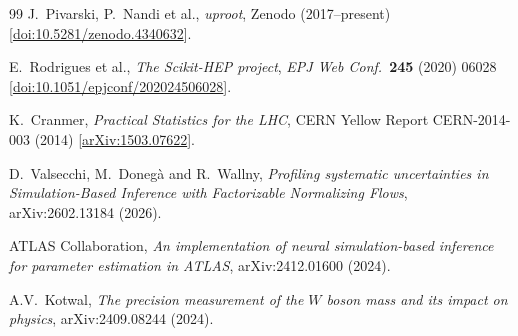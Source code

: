 \documentclass[a4paper,11pt]{article}
\begin{document}
\begin{thebibliography}{99}
  J.~Pivarski, P.~Nandi et al.,
  \emph{uproot},
  Zenodo (2017--present)
  [\href{https://doi.org/10.5281/zenodo.4340632}{doi:10.5281/zenodo.4340632}].

  E.~Rodrigues et al.,
  \emph{The Scikit-HEP project},
  \emph{EPJ Web Conf.}~\textbf{245} (2020) 06028
  [\href{https://doi.org/10.1051/epjconf/202024506028}{doi:10.1051/epjconf/202024506028}].

  K.~Cranmer,
  \emph{Practical Statistics for the LHC},
  CERN Yellow Report CERN-2014-003 (2014)
  [\href{https://arxiv.org/abs/1503.07622}{arXiv:1503.07622}].

  D.~Valsecchi, M.~Doneg{\`a} and R.~Wallny,
  \emph{Profiling systematic uncertainties in Simulation-Based Inference
    with Factorizable Normalizing Flows},
  arXiv:2602.13184 (2026).

  ATLAS Collaboration,
  \emph{An implementation of neural simulation-based inference for
    parameter estimation in ATLAS},
  arXiv:2412.01600 (2024).

  A.V.~Kotwal,
  \emph{The precision measurement of the $W$ boson mass and its impact on
    physics},
  arXiv:2409.08244 (2024).

\end{thebibliography}
\end{document}
